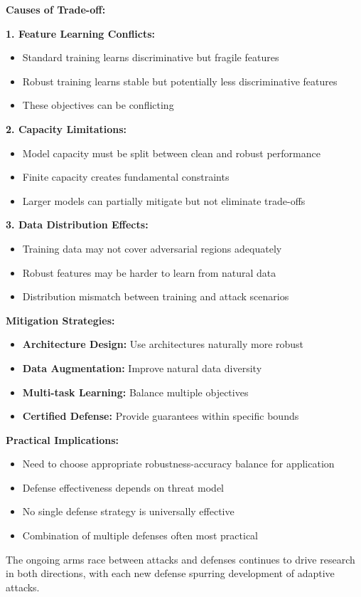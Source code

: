 \documentclass[12pt]{article}
\begin{document}
\begin{enumerate}[(a)]
{    \textbf{Causes of Trade-off:}
    
    \textbf{1. Feature Learning Conflicts:}
    \begin{itemize}
        \item Standard training learns discriminative but fragile features
        \item Robust training learns stable but potentially less discriminative features
        \item These objectives can be conflicting
    \end{itemize}
    
    \textbf{2. Capacity Limitations:}
    \begin{itemize}
        \item Model capacity must be split between clean and robust performance
        \item Finite capacity creates fundamental constraints
        \item Larger models can partially mitigate but not eliminate trade-offs
    \end{itemize}
    
    \textbf{3. Data Distribution Effects:}
    \begin{itemize}
        \item Training data may not cover adversarial regions adequately
        \item Robust features may be harder to learn from natural data
        \item Distribution mismatch between training and attack scenarios
    \end{itemize}
    
    \textbf{Mitigation Strategies:}
    \begin{itemize}
        \item \textbf{Architecture Design:} Use architectures naturally more robust
        \item \textbf{Data Augmentation:} Improve natural data diversity
        \item \textbf{Multi-task Learning:} Balance multiple objectives
        \item \textbf{Certified Defense:} Provide guarantees within specific bounds
    \end{itemize}
    
    \textbf{Practical Implications:}
    \begin{itemize}
        \item Need to choose appropriate robustness-accuracy balance for application
        \item Defense effectiveness depends on threat model
        \item No single defense strategy is universally effective
        \item Combination of multiple defenses often most practical
    \end{itemize}
    
    The ongoing arms race between attacks and defenses continues to drive research in both directions, with each new defense spurring development of adaptive attacks.
    }
\end{enumerate}
\end{document}
